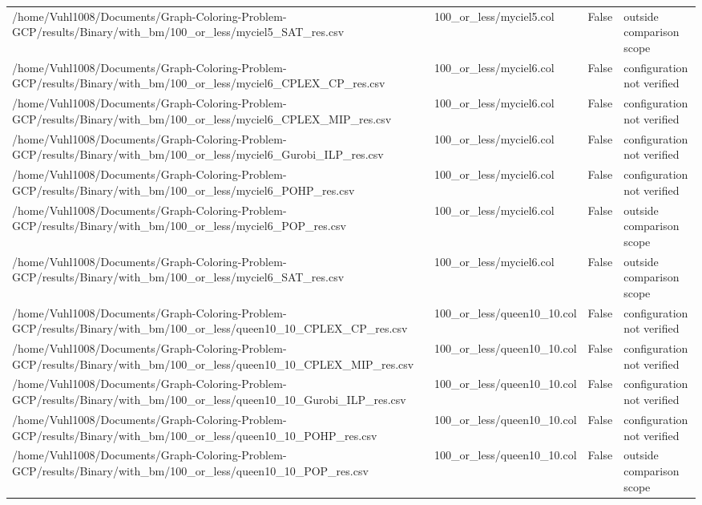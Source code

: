 \begin{table}[htbp]
\begin{tabular}{llll}
/home/Vuhl1008/Documents/Graph-Coloring-Problem-GCP/results/Binary/with\_bm/100\_or\_less/myciel5\_SAT\_res.csv & 100\_or\_less/myciel5.col & False & outside comparison scope \\
/home/Vuhl1008/Documents/Graph-Coloring-Problem-GCP/results/Binary/with\_bm/100\_or\_less/myciel6\_CPLEX\_CP\_res.csv & 100\_or\_less/myciel6.col & False & configuration not verified \\
/home/Vuhl1008/Documents/Graph-Coloring-Problem-GCP/results/Binary/with\_bm/100\_or\_less/myciel6\_CPLEX\_MIP\_res.csv & 100\_or\_less/myciel6.col & False & configuration not verified \\
/home/Vuhl1008/Documents/Graph-Coloring-Problem-GCP/results/Binary/with\_bm/100\_or\_less/myciel6\_Gurobi\_ILP\_res.csv & 100\_or\_less/myciel6.col & False & configuration not verified \\
/home/Vuhl1008/Documents/Graph-Coloring-Problem-GCP/results/Binary/with\_bm/100\_or\_less/myciel6\_POHP\_res.csv & 100\_or\_less/myciel6.col & False & configuration not verified \\
/home/Vuhl1008/Documents/Graph-Coloring-Problem-GCP/results/Binary/with\_bm/100\_or\_less/myciel6\_POP\_res.csv & 100\_or\_less/myciel6.col & False & outside comparison scope \\
/home/Vuhl1008/Documents/Graph-Coloring-Problem-GCP/results/Binary/with\_bm/100\_or\_less/myciel6\_SAT\_res.csv & 100\_or\_less/myciel6.col & False & outside comparison scope \\
/home/Vuhl1008/Documents/Graph-Coloring-Problem-GCP/results/Binary/with\_bm/100\_or\_less/queen10\_10\_CPLEX\_CP\_res.csv & 100\_or\_less/queen10\_10.col & False & configuration not verified \\
/home/Vuhl1008/Documents/Graph-Coloring-Problem-GCP/results/Binary/with\_bm/100\_or\_less/queen10\_10\_CPLEX\_MIP\_res.csv & 100\_or\_less/queen10\_10.col & False & configuration not verified \\
/home/Vuhl1008/Documents/Graph-Coloring-Problem-GCP/results/Binary/with\_bm/100\_or\_less/queen10\_10\_Gurobi\_ILP\_res.csv & 100\_or\_less/queen10\_10.col & False & configuration not verified \\
/home/Vuhl1008/Documents/Graph-Coloring-Problem-GCP/results/Binary/with\_bm/100\_or\_less/queen10\_10\_POHP\_res.csv & 100\_or\_less/queen10\_10.col & False & configuration not verified \\
/home/Vuhl1008/Documents/Graph-Coloring-Problem-GCP/results/Binary/with\_bm/100\_or\_less/queen10\_10\_POP\_res.csv & 100\_or\_less/queen10\_10.col & False & outside comparison scope \\

\end{tabular}
\end{table}
